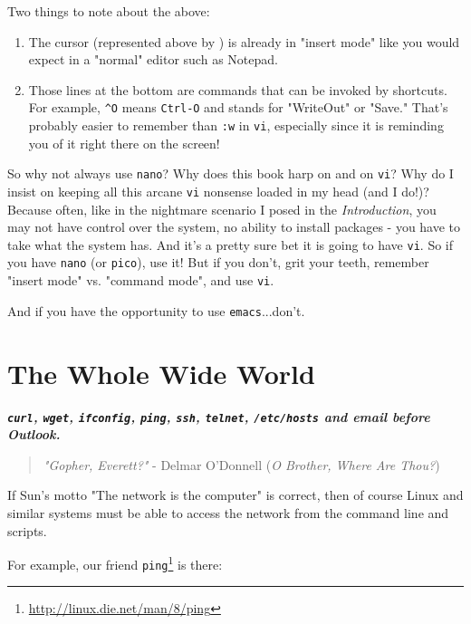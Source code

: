\documentclass[10pt,american,]{book}
\makeatletter
\renewcommand{\href}[2]{#2\footnote{\url{#1}}}
\numberwithin{figure}{chapter}
\DeclareRobustCommand{\drcmd}[1]{\index{Commands!#1@\texttt{#1}}}
\makeatother
\begin{document}
Two things to note about the above:

\begin{enumerate}
\def\labelenumi{\arabic{enumi}.}
\item
  The cursor (represented above by \texttt{\textbar{}}) is already in
  "insert mode" like you would expect in a "normal" editor such as
  Notepad.
\item
  Those lines at the bottom are commands that can be invoked by
  shortcuts. For example, \texttt{\^{}O} means \texttt{Ctrl-O} and
  stands for "WriteOut" or "Save." That's probably easier to remember
  than \texttt{:w} in \texttt{vi}, especially since it is reminding you
  of it right there on the screen!
\end{enumerate}

So why not always use \texttt{nano}? Why does this book harp on and on
\texttt{vi}? Why do I insist on keeping all this arcane \texttt{vi}
nonsense loaded in my head (and I do!)? Because often, like in the
nightmare scenario I posed in the \emph{Introduction}, you may not have
control over the system, no ability to install packages - you have to
take what the system has. And it's a pretty sure bet it is going to have
\texttt{vi}. So if you have \texttt{nano} (or \texttt{pico}), use it!
But if you don't, grit your teeth, remember "insert mode" vs. "command
mode", and use \texttt{vi}.

And if you have the opportunity to use \texttt{emacs}...don't.

\hypertarget{the-whole-wide-world}{\chapter{The Whole Wide
World}\label{the-whole-wide-world}}

\textbf{\emph{\texttt{curl}, \texttt{wget}, \texttt{ifconfig},
\texttt{ping}, \texttt{ssh}, \texttt{telnet}, \texttt{/etc/hosts} and
email before Outlook.}}

\begin{quote}
\emph{"Gopher, Everett?"} - Delmar O'Donnell (\emph{O Brother, Where Are
Thou?})
\end{quote}

If Sun's motto "The network is the computer" is correct, then of course
Linux and similar systems must be able to access the network from the
command line and scripts.

For example, our friend
\href{http://linux.die.net/man/8/ping}{\texttt{ping}}\drcmd{ping} is
there:
\end{document}

